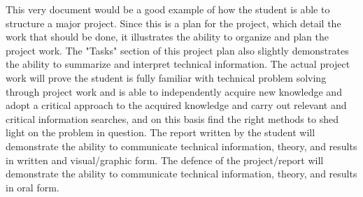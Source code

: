 This very document would be a good example of how the student is able to structure a major project. Since this is a plan for the project, which detail the work that should be done, it illustrates the ability to organize and plan the project work. The "Tasks" section of this project plan also slightly demonstrates the ability to summarize and interpret technical information. The actual project work will prove the student is fully familiar with technical problem solving through project work and is able to independently acquire new knowledge and adopt a critical approach to the acquired knowledge and carry out relevant and critical information searches, and on this basis find the right methods to shed light on the problem in question. The report written by the student will demonstrate the ability to communicate technical information, theory, and results in written and visual/graphic form. The defence of the project/report will demonstrate the ability to communicate technical information, theory, and results in oral form.